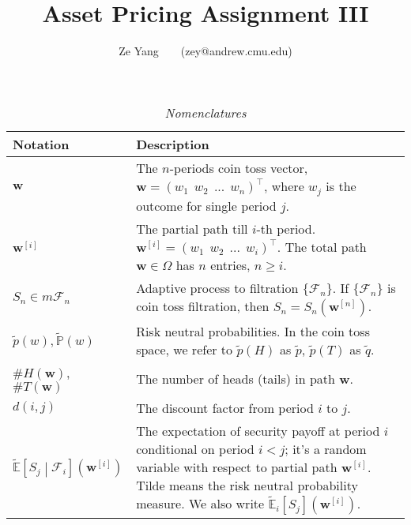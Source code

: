 \documentclass[a4paper, 10pt]{article}
\title{\textbf{Asset Pricing Assignment III}}
\author{Ze Yang~~~~(zey@andrew.cmu.edu)}
\renewcommand{\arraystretch}{1.4}
\theoremstyle{definition}
\theoremstyle{hSol}
\begin{document}
\maketitle

\begin{table}[h]
\vspace{-10pt}
\caption{\textit{Nomenclatures}}
\vspace{3pt}
\centering
\def\arraystretch{1.15}
\begin{tabular}{lL}
\hline
Notation & \hspace{4.6cm} Description \\ 
\hline
$\bm{w}$ & The $n$-periods coin toss vector, $\bm{w} = (w_1~~w_2~~...~~w_n)^{\top}$, where $w_j$ is the outcome for single period $j$.\\
$\bm{w}^{[i]}$ & The partial path till $i$-th period. $\bm{w}^{[i]} = (w_1~~w_2~~...~~w_i)^{\top}$. The total path $\bm{w} \in \Omega $ has $n$ entries, $n\geq i$.\\
$S_n \in m \mathcal{F}_n$ & Adaptive process to filtration $\{\mathcal{F}_n\}$. If $\{\mathcal{F}_n\}$ is coin toss filtration, then $S_n = S_n(\bm{w}^{[n]})$.\\
$\tilde{p}(w), \tilde{\mathbb{P}}\left(w\right)$ & Risk neutral probabilities. In the coin toss space, we refer to $\tilde{p}(H)$ as $\tilde{p}$, $\tilde{p}(T)$ as $\tilde{q}$.\\
$\#H(\bm{w})$, $\#T(\bm{w})$ & The number of heads (tails) in path $\bm{w}$. \\
$d(i, j)$ & The discount factor from period $i$ to $j$. \\
$\tilde{\mathbb{E}}\left[S_{j}\middle|\mathcal{F}_{i}\right](\bm{w}^{[i]})$ & The expectation of security payoff at period $i$ conditional on period $i<j$; it's a random variable with respect to partial path $\bm{w}^{[i]}$. Tilde means the risk neutral probability measure. We also write $\tilde{\mathbb{E}}_i\left[S_{j}\right](\bm{w}^{[i]})$.\\
\hline 
\end{tabular}
\label{tab:Nomen}
\end{table}
\end{document}
